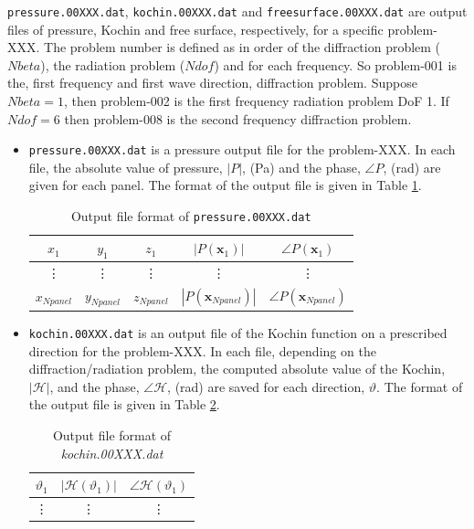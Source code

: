 \documentclass[12pt,a4paper,titlepage]{article}
\newcommand{\bs}{\boldsymbol}
\begin{document}
\noindent
\texttt{pressure.00XXX.dat}, \texttt{kochin.00XXX.dat} and \texttt{freesurface.00XXX.dat} are output files of pressure, Kochin and free surface, respectively, for a specific problem-XXX. The problem number is defined as in order of the diffraction problem ($Nbeta$), the radiation problem ($Ndof$) and for each frequency. So problem-001 is the, first frequency and first wave direction, diffraction problem. Suppose $Nbeta=1$, then problem-002 is the first frequency radiation problem DoF 1. If $Ndof=6$ then problem-008 is the second frequency diffraction problem.
\begin{itemize}
    \item \texttt{pressure.00XXX.dat} is a pressure output file for the problem-XXX.  In each file, the absolute value of pressure, $|P|$, (Pa) and the phase, $\angle P$, (rad) are given for each panel. The format of the output file is given in Table \ref{tab:pressure}.
\begin{table}[ht]
\begin{center}
\caption{Output file format of \texttt{pressure.00XXX.dat}}\label{tab:pressure}
\begin{tabular}{ccccc}
\hline
$x_1$ &$y_1$ &$z_1$ &$|P(\bs x_1)|$ & $\angle P(\bs x_1)$\\
\hline
\vdots &\vdots &\vdots &\vdots &\vdots
\\
\hline
$x_{Npanel}$ &$y_{Npanel}$ &$z_{Npanel}$ &$|P(\bs x_{Npanel})|$ & $\angle P(\bs x_{Npanel})$\\
\hline
\end{tabular}
\end{center}
\end{table}
    \item \texttt{kochin.00XXX.dat} is an output file of the Kochin function on a prescribed direction for the problem-XXX. In each file, depending on the diffraction/radiation problem, the computed absolute value of the Kochin, $|\mathcal{H}|$, and the phase, $\angle \mathcal{H}$, (rad) are saved for each direction, $\vartheta$. The format of the output file is given in Table \ref{tab:kochin}.
\begin{table}[ht]
\begin{center}
\caption{Output file format of \textit{kochin.00XXX.dat}}\label{tab:kochin}
\begin{tabular}{ccc}
\hline
$\vartheta_1$ &$|\mathcal{H}(\vartheta_1)|$ & $\angle \mathcal{H}(\vartheta_1)$\\
\hline
\vdots &\vdots &\vdots
\\
\hline

\end{tabular}
\end{center}
\end{table}
\end{itemize}
\end{document}
